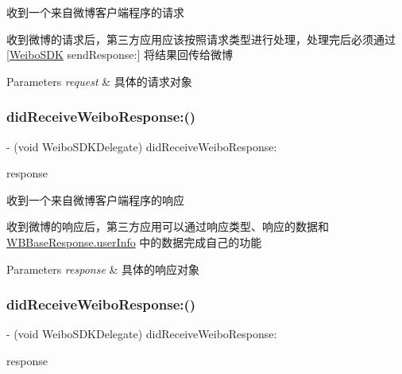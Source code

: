 收到一个来自微博客户端程序的请求

收到微博的请求后，第三方应用应该按照请求类型进行处理，处理完后必须通过 \mbox{[}\mbox{\hyperlink{interface_weibo_s_d_k}{Weibo\+S\+DK}} send\+Response\+:\mbox{]} 将结果回传给微博 
\begin{DoxyParams}{Parameters}
{\em request} & 具体的请求对象 \\
\hline
\end{DoxyParams}
\mbox{\label{protocol_weibo_s_d_k_delegate_01-p_ab644aa5faa87eea8ff974ac274c3c595}} 
\subsubsection{\texorpdfstring{did\+Receive\+Weibo\+Response\+:()}{didReceiveWeiboResponse:()}\hspace{0.1cm}{\footnotesize\ttfamily [1/3]}}
{\footnotesize\ttfamily -\/ (void Weibo\+S\+D\+K\+Delegate) did\+Receive\+Weibo\+Response\+: \begin{DoxyParamCaption}\item[{(\mbox{\hyperlink{interface_w_b_base_response}{W\+B\+Base\+Response}} $\ast$)}]{response }\end{DoxyParamCaption}}

收到一个来自微博客户端程序的响应

收到微博的响应后，第三方应用可以通过响应类型、响应的数据和 \mbox{\hyperlink{interface_w_b_data_transfer_object_ab9b7bf91e1470d29782202c04d1a86fe}{W\+B\+Base\+Response.\+user\+Info}} 中的数据完成自己的功能 
\begin{DoxyParams}{Parameters}
{\em response} & 具体的响应对象 \\
\hline
\end{DoxyParams}
\mbox{\label{protocol_weibo_s_d_k_delegate_01-p_ab644aa5faa87eea8ff974ac274c3c595}} 
\subsubsection{\texorpdfstring{did\+Receive\+Weibo\+Response\+:()}{didReceiveWeiboResponse:()}\hspace{0.1cm}{\footnotesize\ttfamily [2/3]}}
{\footnotesize\ttfamily -\/ (void Weibo\+S\+D\+K\+Delegate) did\+Receive\+Weibo\+Response\+: \begin{DoxyParamCaption}\item[{(\mbox{\hyperlink{interface_w_b_base_response}{W\+B\+Base\+Response}} $\ast$)}]{response }\end{DoxyParamCaption}}


